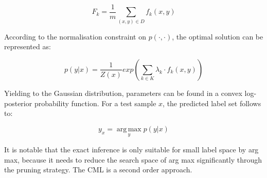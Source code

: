 \begin{equation}\label{eq:CMLExpect}
F_{k} = \frac{1}{m}\sum_{(x,y) \in D}f_{k}(x,y)
\end{equation}

According to the normalisation constraint on $p(\cdot,\cdot)$, the optimal solution can be represented as:

\begin{equation}\label{eq:CMLOptimal}
p(y|x) = \frac{1}{Z(x)}exp(\sum_{k \in K}\lambda_{k} \cdot f_{k}(x,y))
\end{equation}

Yielding to the Gaussian distribution, parameters can be found in a convex log-posterior probability function. For a test sample $x$, the predicted label set follows to:

\begin{equation}\label{eq:CMLLabel}
y_{x} = \operatorname*{arg\,max}_{y} p(y|x)
\end{equation}

It is notable that the exact inference is only suitable for small label space by arg max, because it needs to reduce the search space of arg max significantly through the pruning strategy. The CML is a second order approach.